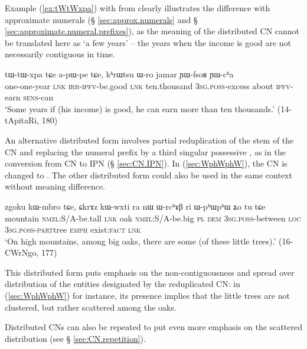  Example (\ref{ex:tWtWxpa}) with  from  clearly illustrates the difference with approximate numerals (§ \ref{sec:approx.numerals} and § \ref{sec:approximate.numeral.prefixes}), as the meaning of the distributed CN cannot be translated here as `a few years' -- the years when the income is good are not necessarily contiguous in time.

\begin{exe}
\ex  \label{ex:tWtWxpa}
\gll   tɯ-tɯ-xpa tɕe a-pɯ-pe tɕe, kʰrɯtsu ɯ-ro jamar ɲɯ-fsoʁ ɲɯ-cʰa \\
one-one-year  \textsc{lnk} \textsc{irr}-\textsc{ipfv}-be.good \textsc{lnk} ten.thousand \textsc{3sg}.\textsc{poss}-excess about \textsc{ipfv}-earn \textsc{sens}-can \\ 
\glt `Some years if (his income) is good, he can earn more than ten thousands.' (14-tApitaRi, 180)
\end{exe}

An alternative distributed form involves partial reduplication of the stem of the CN and replacing the numeral prefix by a third singular possessive , as in the conversion from CN to IPN (§ \ref{sec:CN.IPN}). In (\ref{sec:WphWphW}), the CN  is changed to . The other distributed form  could also be used in the same context without meaning difference. 

\begin{exe}
\ex \label{sec:WphWphW}
\gll zgoku kɯ-mbro tɕe, ɕkrɤz kɯ-wxti ra nɯ ɯ-rcʰɤβ ri ɯ-pʰɯ\redp{}pʰɯ ʑo tu tɕe \\
mountain \textsc{nmzl}:S/A-be.tall \textsc{lnk} oak \textsc{nmzl}:S/A-be.big \textsc{pl} \textsc{dem} \textsc{3sg}.\textsc{poss}-between \textsc{loc} \textsc{3sg}.\textsc{poss}-\textsc{part}\redp{}tree \textsc{emph} exist:\textsc{fact} \textsc{lnk} \\
\glt `On high mountains, among big oaks, there are some (of these little trees).' (16-CWrNgo, 177)
\end{exe}   

This distributed form puts emphasis on the non-contiguousness and spread over distribution of the entities designated by the reduplicated CN: in (\ref{sec:WphWphW}) for instance, its presence implies that the little trees are not clustered, but rather scattered among the oaks.

Distributed CNs can also be repeated to put even more emphasis on the scattered distribution (see § \ref{sec:CN.repetition}).

